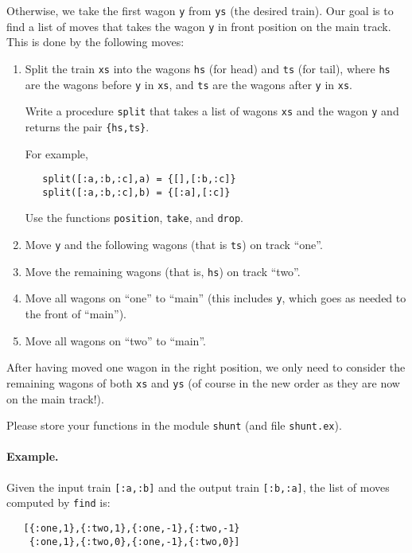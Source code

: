 \documentclass[a4paper,11pt]{article}
\begin{document}
Otherwise, we take the first wagon \verb+y+ from \verb+ys+ (the
desired train). Our goal is to find a list of moves that takes
the wagon \verb+y+ in front position on the main track. This is
done by the following moves:
\begin{enumerate}
  
\item Split the train \verb+xs+ into the wagons \verb+hs+ (for head) and
  \verb+ts+ (for tail), where \verb+hs+ are the wagons before \verb+y+
  in \verb+xs+, and \verb+ts+ are the wagons after \verb+y+ in \verb+xs+.

  Write a procedure \verb+split+ that takes a list of wagons
  \verb+xs+ and the wagon \verb+y+ and returns the pair \verb+{hs,ts}+.

  For example, 
\begin{verbatim}
   split([:a,:b,:c],a) = {[],[:b,:c]}
   split([:a,:b,:c],b) = {[:a],[:c]}
\end{verbatim}
  
  Use the functions \verb+position+, \verb+take+, and \verb+drop+.

\item Move \verb+y+ and the following wagons (that is \verb+ts+) on track
  ``one''.
  
\item Move the remaining wagons (that is, \verb+hs+) on track
  ``two''.
  
\item Move all wagons on ``one'' to ``main'' (this includes \verb+y+,
  which goes as needed to the front of ``main'').
  
\item Move all wagons on ``two'' to ``main''.
\end{enumerate}

After having moved one wagon in the right position, we only need
to consider the remaining wagons of both \verb+xs+ and \verb+ys+
(of course in the new order as they are now on the main track!).

Please store your functions in the module \verb+shunt+ (and file
\verb+shunt.ex+).


\paragraph{Example.}
Given the input train \verb+[:a,:b]+ and the output train \verb+[:b,:a]+, the
list of moves computed by \verb+find+ is:
\begin{verbatim}
   [{:one,1},{:two,1},{:one,-1},{:two,-1} 
    {:one,1},{:two,0},{:one,-1},{:two,0}]
\end{verbatim}
\end{document}
